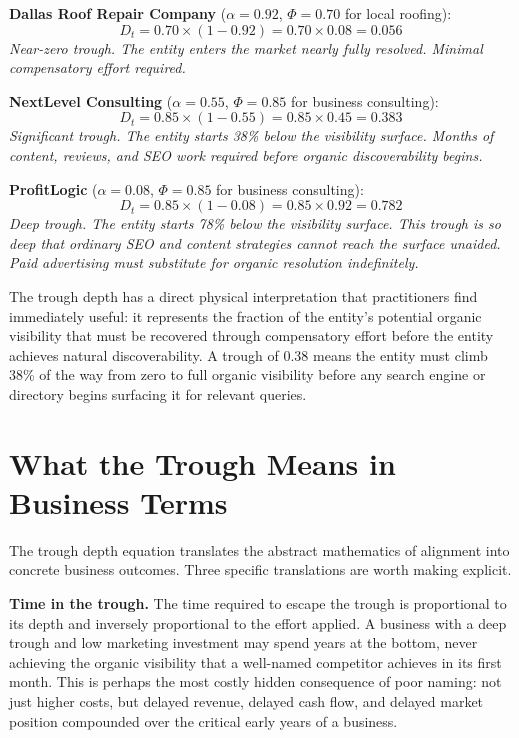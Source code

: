 \documentclass[12pt, openany]{book}
\theoremstyle{thmstyle}
\theoremstyle{defstyle}
\begin{document}
\begin{calcbox}
\textbf{Dallas Roof Repair Company} ($\alpha = 0.92$, $\Phi = 0.70$ for local roofing):
\[
D_t = 0.70 \times (1 - 0.92) = 0.70 \times 0.08 = 0.056
\]
\textit{Near-zero trough. The entity enters the market nearly fully resolved. Minimal compensatory effort required.}

\vspace{8pt}
\textbf{NextLevel Consulting} ($\alpha = 0.55$, $\Phi = 0.85$ for business consulting):
\[
D_t = 0.85 \times (1 - 0.55) = 0.85 \times 0.45 = 0.383
\]
\textit{Significant trough. The entity starts 38\% below the visibility surface. Months of content, reviews, and SEO work required before organic discoverability begins.}

\vspace{8pt}
\textbf{ProfitLogic} ($\alpha = 0.08$, $\Phi = 0.85$ for business consulting):
\[
D_t = 0.85 \times (1 - 0.08) = 0.85 \times 0.92 = 0.782
\]
\textit{Deep trough. The entity starts 78\% below the visibility surface. This trough is so deep that ordinary SEO and content strategies cannot reach the surface unaided. Paid advertising must substitute for organic resolution indefinitely.}
\end{calcbox}

The trough depth has a direct physical interpretation that practitioners find immediately useful: it represents the fraction of the entity's potential organic visibility that must be recovered through compensatory effort before the entity achieves natural discoverability. A trough of 0.38 means the entity must climb 38\% of the way from zero to full organic visibility before any search engine or directory begins surfacing it for relevant queries.

\section{What the Trough Means in Business Terms}

The trough depth equation translates the abstract mathematics of alignment into concrete business outcomes. Three specific translations are worth making explicit.

\textbf{Time in the trough.} The time required to escape the trough is proportional to its depth and inversely proportional to the effort applied. A business with a deep trough and low marketing investment may spend years at the bottom, never achieving the organic visibility that a well-named competitor achieves in its first month. This is perhaps the most costly hidden consequence of poor naming: not just higher costs, but delayed revenue, delayed cash flow, and delayed market position compounded over the critical early years of a business.
\end{document}
